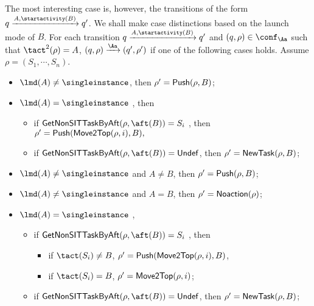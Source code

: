 {The most interesting case is, however, the transitions of the form $q \xrightarrow{A, \startactivity(B)}q'$. We shall make case distinctions based on the launch mode of $B$.
For each transition $q \xrightarrow{A, \startactivity(B)}q'$ and $(q, \rho) \in \conf_\Aa$ such that $\tact^2(\rho) = A$, $(q, \rho) \xrightarrow{\Aa} (q', \rho')$ if one of the following cases holds. Assume $\rho=(S_1,\cdots, S_n)$.

\smallskip

\noindent {}
	\begin{itemize}
		\item $\lmd(A) \neq \singleinstance$, then $\rho'= {\sf Push}(\rho,B)$;
		\item $\lmd(A) = \singleinstance$ , then
    		\begin{itemize}
    			\item if ${\sf GetNonSITTaskByAft}(\rho, \aft(B))=S_i$ , then  $\rho'={\sf Push}({\sf Move2Top}(\rho, i),B),$
    			\item if ${\sf GetNonSITTaskByAft}(\rho, \aft(B))={\sf Undef}$, then $\rho'= {\sf NewTask}(\rho,B )$;
    		\end{itemize}
	\end{itemize}

\noindent  {}
	\begin{itemize}
		\item  $\lmd(A) \neq \singleinstance$ and $A \neq B$, then $\rho' = {\sf Push}(\rho,B)$;
		\item  $\lmd(A) \neq \singleinstance$ and $A = B$, then $\rho' =  {\sf Noaction}(\rho)$;
		\item $\lmd(A) = \singleinstance$ ,
              \begin{itemize}
                 \item if ${\sf GetNonSITTaskByAft}(\rho, \aft(B))=S_i$ , then
        		 \begin{itemize}
        			\item if $\tact(S_i) \neq B$, $\rho'={\sf Push}({\sf Move2Top}(\rho, i),B)$,
        			\item if $\tact(S_i) = B$, $\rho' = {\sf Move2Top}(\rho, i)$;
        		 \end{itemize}       		
        		\item if ${\sf GetNonSITTaskByAft}(\rho, \aft(B))={\sf Undef}$, then  $\rho'= {\sf NewTask}(\rho,B )$;
              \end{itemize}
	 \end{itemize}
	
}
